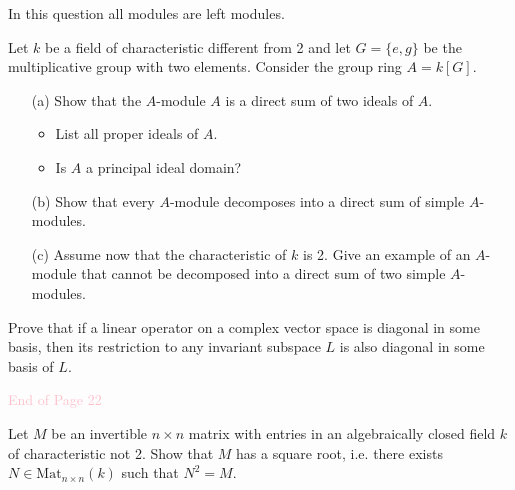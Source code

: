 \begin{prob}[F2018-Q4]
    In this question all modules are left modules.

Let \( k \) be a field of characteristic different from 2 and let \( G = \{e, g\} \) be the multiplicative group with two elements. Consider the group ring \( A = k[G] \).

\begin{enumerate}
    \item[(a)] Show that the \( A \)-module \( A \) is a direct sum of two ideals of \( A \).
    \begin{itemize}
        \item List all proper ideals of \( A \).
        \item Is \( A \) a principal ideal domain?
    \end{itemize}
    
    \item[(b)] Show that every \( A \)-module decomposes into a direct sum of simple \( A \)-modules.
    
    \item[(c)] Assume now that the characteristic of \( k \) is 2. Give an example of an \( A \)-module that cannot be decomposed into a direct sum of two simple \( A \)-modules.
\end{enumerate}
\end{prob}


\begin{prob}[S2003-Q3]
    Prove that if a linear operator on a complex vector space is diagonal in some basis, then its restriction to any invariant subspace \( L \) is also diagonal in some basis of \( L \).
\end{prob}


\begin{center}
    \textcolor{pink}{End of Page 22}
\end{center}


\begin{prob}[S2017-Q4]
    Let \(M\) be an invertible \(n\times n\) matrix with entries in an algebraically closed field \(k\) of characteristic not 2. Show that \(M\) has a square root, i.e. there exists \(N\in\text{Mat}_{n\times n}(k)\) such that \(N^{2}=M\).
\end{prob}


